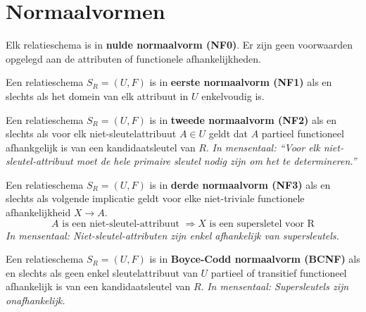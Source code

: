 \documentclass[normaalvormen.tex]{subfiles}
\begin{document}
\section{Normaalvormen}
\begin{de}
Elk relatieschema is in \textbf{nulde normaalvorm (NF0)}. Er zijn geen voorwaarden opgelegd aan de attributen of functionele afhankelijkheden.
\end{de}
\begin{de}
Een relatieschema $S_{R} = (U,F)$ is in \textbf{eerste normaalvorm (NF1)} als en slechts als het domein van elk attribuut in $U$ enkelvoudig is.
\end{de}
\begin{de}
Een relatieschema $S_{R} = (U,F)$ is in \textbf{tweede normaalvorm (NF2)} als en slechts als voor elk niet-sleutelattribuut $A \in U$ geldt dat $A$ partieel functioneel afhankgelijk is van een kandidaatsleutel van $R$.
\emph{In mensentaal: ``Voor elk niet-sleutel-attribuut moet de hele primaire sleutel nodig zijn om het te determineren.''}
\end{de}
\begin{de}
Een relatieschema $S_{R} = (U,F)$ is in \textbf{derde normaalvorm (NF3)} als en slechts als volgende implicatie geldt voor elke niet-triviale functionele afhankelijkheid $X\rightarrow A$.
\[
A \text{ is een niet-sleutel-attribuut } \Rightarrow X \text{ is een supersletel voor R}
\]
\emph{In mensentaal: Niet-sleutel-attributen zijn enkel afhankelijk van supersleutels.}
\end{de}
\begin{de}
Een relatieschema $S_{R} = (U,F)$ is in \textbf{Boyce-Codd normaalvorm (BCNF)} als en slechts als geen enkel sleutelattribuut van $U$ partieel of transitief functioneel afhankelijk is van een kandidaatsleutel van $R$.
\emph{In mensentaal: Supersleutels zijn onafhankelijk.}
\end{de}
\end{document}
